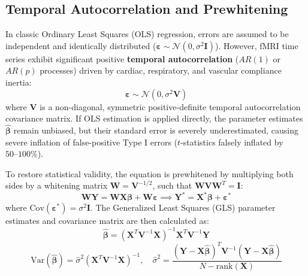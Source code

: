 \documentclass[11pt,a4paper]{article}
\begin{document}
\subsection{Temporal Autocorrelation and Prewhitening}
In classic Ordinary Least Squares (OLS) regression, errors are assumed to be independent and identically distributed ($\boldsymbol{\varepsilon} \sim \mathcal{N}(0, \sigma^2 \mathbf{I})$). However, fMRI time series exhibit significant positive \textbf{temporal autocorrelation} ($AR(1)$ or $AR(p)$ processes) driven by cardiac, respiratory, and vascular compliance inertia:
\begin{equation}
    \boldsymbol{\varepsilon} \sim \mathcal{N}(0, \sigma^2 \mathbf{V})
\end{equation}
where $\mathbf{V}$ is a non-diagonal, symmetric positive-definite temporal autocorrelation covariance matrix. If OLS estimation is applied directly, the parameter estimates $\hat{\boldsymbol{\beta}}$ remain unbiased, but their standard error is severely underestimated, causing severe inflation of false-positive Type I errors ($t$-statistics falsely inflated by $50\text{--}100\%$).

To restore statistical validity, the equation is prewhitened by multiplying both sides by a whitening matrix $\mathbf{W} = \mathbf{V}^{-1/2}$, such that $\mathbf{W} \mathbf{V} \mathbf{W}^T = \mathbf{I}$:
\begin{equation}
    \mathbf{W} \mathbf{Y} = \mathbf{W} \mathbf{X} \boldsymbol{\beta} + \mathbf{W} \boldsymbol{\varepsilon} \implies \mathbf{Y}^* = \mathbf{X}^* \boldsymbol{\beta} + \boldsymbol{\varepsilon}^*
\end{equation}
where $\text{Cov}(\boldsymbol{\varepsilon}^*) = \sigma^2 \mathbf{I}$. The Generalized Least Squares (GLS) parameter estimates and covariance matrix are then calculated as:
\begin{equation}
    \hat{\boldsymbol{\beta}} = \left( \mathbf{X}^T \mathbf{V}^{-1} \mathbf{X} \right)^{-1} \mathbf{X}^T \mathbf{V}^{-1} \mathbf{Y}
\end{equation}
\begin{equation}
    \text{Var}(\hat{\boldsymbol{\beta}}) = \hat{\sigma}^2 \left( \mathbf{X}^T \mathbf{V}^{-1} \mathbf{X} \right)^{-1}, \quad \hat{\sigma}^2 = \frac{(\mathbf{Y} - \mathbf{X}\hat{\boldsymbol{\beta}})^T \mathbf{V}^{-1} (\mathbf{Y} - \mathbf{X}\hat{\boldsymbol{\beta}})}{N - \text{rank}(\mathbf{X})}
\end{equation}
\end{document}
